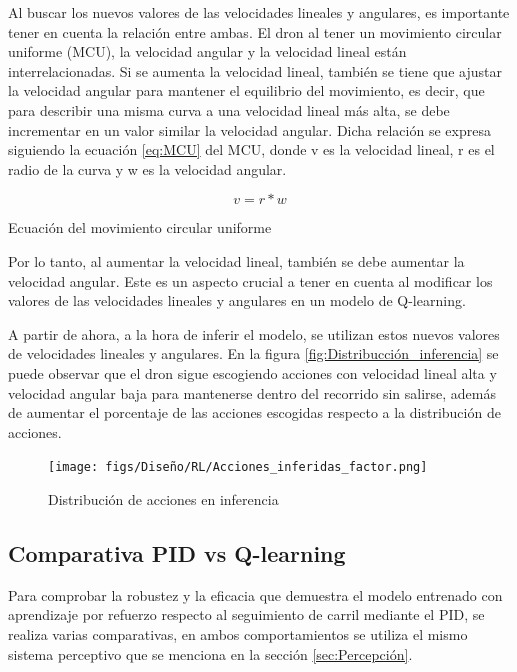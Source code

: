 Al buscar los nuevos valores de las velocidades lineales y angulares, es importante tener en cuenta la relación entre ambas. El dron al tener un movimiento circular uniforme (MCU), la velocidad 
angular y la velocidad lineal están interrelacionadas. Si se aumenta la velocidad lineal, también se tiene que ajustar la velocidad angular para mantener el equilibrio del movimiento, 
es decir, que para describir una misma curva a una velocidad lineal más alta, se debe incrementar en un valor similar la velocidad angular. Dicha 
relación se expresa siguiendo la ecuación \ref{eq:MCU} del MCU, donde v es la velocidad lineal, r es el radio de la curva y w es la velocidad angular. 

\begin{myequation}[ht]
  \begin{equation}
    v = r*w
    \label{eq:MCU}
  \end{equation}
  \caption{Ecuación del movimiento circular uniforme}
\end{myequation}

 Por lo tanto, al aumentar la velocidad lineal, también se debe aumentar la velocidad angular. Este es un aspecto crucial a tener en cuenta al modificar los valores de las velocidades 
 lineales y angulares en un modelo de Q-learning. 

 A partir de ahora, a la hora de inferir el modelo, se utilizan estos nuevos valores de velocidades lineales y angulares. En la figura \ref{fig:Distribucción_inferencia} se puede observar 
 que el dron sigue escogiendo acciones con velocidad lineal alta y velocidad angular baja para mantenerse dentro del recorrido sin salirse, además de aumentar 
 el porcentaje de las acciones escogidas respecto a la distribución de acciones. 

\begin{figure} [H]
  \begin{center}
    \texttt{[image: figs/Diseño/RL/Acciones\_inferidas\_factor.png]}
  \end{center}
  \caption{Distribución de acciones en inferencia}
  \label{fig:inferencia_factor}
\end{figure}

\subsection{Comparativa PID vs Q-learning}
\label{sec:Análisis y comparativa entre el seguiento de carril clásico}
Para comprobar la robustez y la eficacia que demuestra el modelo entrenado con aprendizaje por refuerzo respecto al seguimiento de carril mediante el PID, se realiza varias comparativas, en ambos
comportamientos se utiliza el mismo sistema perceptivo que se menciona en la sección \ref{sec:Percepción}. 

